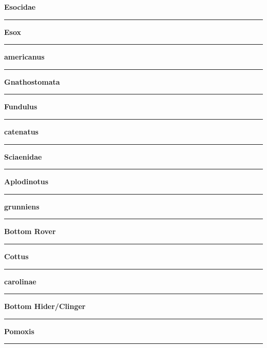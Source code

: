 \documentclass[11pt]{exam}
\newcommand*\Matching[1]{
\ifprintanswers
	\textbf{#1}
\else
	\rule{2.1in}{0.4pt}
\fi
}
\newlength\matchlena
\newlength\matchlenb
\newcommand\MatchQuestion[2]{%
	\setlength\matchlenb{\linewidth}
	\addtolength\matchlenb{-\matchlena}
	\parbox[t]{\matchlena}{\Matching{#1}}\enspace\parbox[t]{\matchlenb}{#2}}
\begin{document}
\begin{questions}


\vspace{1\baselineskip}

\begin{multicols}{2}
	
	\question\MatchQuestion{Esocidae}{}
	\vspace{1.5\baselineskip}
	
	\question\MatchQuestion{Esox}{}
	\vspace{1.5\baselineskip}
	
	\question\MatchQuestion{americanus}{}
	\vspace{1.5\baselineskip}
	
	\question\MatchQuestion{Gnathostomata}{}
	\vspace{1.5\baselineskip}
	
	\question\MatchQuestion{Fundulus}{}
	\vspace{1.5\baselineskip}
	
	\question\MatchQuestion{catenatus}{}
	\vspace{1.5\baselineskip}
	
	\question\MatchQuestion{Sciaenidae}{}
	\vspace{1.5\baselineskip}
	
	\question\MatchQuestion{Aplodinotus}{}
	\vspace{1.5\baselineskip}
	
	\question\MatchQuestion{grunniens}{}
	\vspace{1.5\baselineskip}
	
	\question\MatchQuestion{Bottom Rover}{}
	\vspace{1.5\baselineskip}
	
	\question\MatchQuestion{Cottus}{}
	\vspace{1.5\baselineskip}
	
	\question\MatchQuestion{carolinae}{}
	\vspace{1.5\baselineskip}
	
	\question\MatchQuestion{Bottom Hider/Clinger}{}
	\vspace{1.5\baselineskip}
	
	\question\MatchQuestion{Pomoxis}{}
	\vspace{1.5\baselineskip}
	

\end{multicols}
\end{questions}
\end{document}
